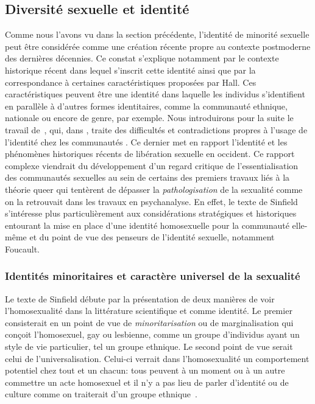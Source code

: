 \subsection{Diversité sexuelle et identité}
\label{sec:diversit_sexuelle_et_identit_} Comme nous l'avons vu dans la section précédente, l'identité de minorité sexuelle peut être considérée comme une création récente propre au contexte postmoderne des dernières décennies. 
Ce constat s'explique notamment par le contexte historique récent dans lequel s'inscrit cette identité ainsi que par la correspondance à certaines caractéristiques proposées par Hall. Ces caractéristiques peuvent être une identité dans laquelle les individus s'identifient en parallèle à d'autres formes identitaires, comme la communauté ethnique, nationale ou encore de genre, par exemple.
Nous introduirons pour la suite le travail de~\citet{Sinfield1996}, qui, dans , traite des difficultés et contradictions propres à l'usage de l'identité chez les communautés \lgbt{}.
Ce dernier met en rapport l'identité et les phénomènes historiques récents de libération sexuelle en occident.
Ce rapport complexe viendrait du développement d'un regard critique de l'essentialisation des communautés sexuelles au sein de certains des premiers travaux liés à la théorie queer qui tentèrent de dépasser la \emph{pathologisation} de la sexualité comme on la retrouvait dans les travaux en psychanalyse. 
En effet, le texte de Sinfield s'intéresse plus particulièrement aux considérations stratégiques et historiques entourant la mise en place d'une identité homosexuelle pour la communauté elle-même et du point de vue des penseurs de l'identité sexuelle, notamment Foucault.

\subsubsection{Identités minoritaires et caractère universel de la sexualité}
\label{sub:minorit_s_et_universel}
Le texte de Sinfield débute par la présentation de deux manières de voir l'homosexualité dans la littérature scientifique et comme identité.
Le premier consisterait en un point de vue de \emph{minoritarisation} ou de marginalisation qui conçoit l'homosexuel, gay ou lesbienne, comme un groupe d'individus ayant un style de vie particulier, tel un groupe ethnique.
Le second point de vue serait celui de l'universalisation. 
Celui-ci verrait dans l'homosexualité un comportement potentiel chez tout et un chacun: tous peuvent à un moment ou à un autre commettre un acte homosexuel et il n'y a pas lieu de parler d'identité ou de culture comme on traiterait d'un groupe ethnique~\citep[271]{Sinfield1996}.

